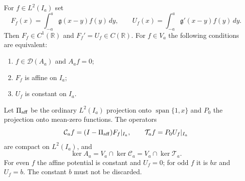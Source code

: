 \begin{proposition}
\label{prop:ns51-affine-potential}
For $f\in L^2(I_a)$ set
\[
 F_f(x)=\int_{-a}^a\mathfrak g(x-y)f(y)\,dy,\qquad
 U_f(x)=\int_{-a}^a\mathfrak g'(x-y)f(y)\,dy.
\]
Then $F_f\in C^1(\mathbb R)$ and $F_f'=U_f\in C(\mathbb R)$.
For $f\in V_a$ the following conditions are equivalent:
\begin{enumerate}[label=(\roman*)]
 \item $f\in\mathcal D(A_a)$ and $A_af=0$;
 \item $F_f$ is affine on $I_a$;
 \item $U_f$ is constant on $I_a$.
\end{enumerate}
Let $\Pi_{\rm aff}$ be the ordinary $L^2(I_a)$ projection onto
$\operatorname{span}\{1,x\}$ and $P_0$ the projection onto mean-zero
functions. The operators
\[
 \mathcal C_a f=(I-\Pi_{\rm aff})F_f|_{I_a},\qquad
 \mathcal T_a f=P_0 U_f|_{I_a}
\]
are compact on $L^2(I_a)$, and
\begin{equation}\label{eq:ns51-kernel-reduction}
 \ker A_a=V_a\cap\ker\mathcal C_a=V_a\cap\ker\mathcal T_a.
\end{equation}
For even $f$ the affine potential is constant and $U_f=0$; for odd
$f$ it is $b x$ and $U_f=b$. The constant $b$ must not be discarded.
\end{proposition}
